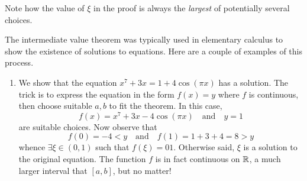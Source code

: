 
Note how the value of $\xi$ in the proof is always the \emph{largest} of potentially several choices.\smallbreak



\begin{examples}{}{}
	The intermediate value theorem was typically used in elementary calculus to show the existence of solutions to equations. Here are a couple of examples of this process.
	\begin{enumerate}
	  \item We show that the equation $x^7+3x=1+4\cos(\pi x)$ has a solution.\smallbreak
		The trick is to express the equation in the form $f(x)=y$ where $f$ is continuous, then choose suitable $a,b$ to fit the theorem. In this case,
		\[f(x)=x^7+3x-4\cos(\pi x)\quad\text{and}\quad y=1\]
		are suitable choices. Now observe that
		\[f(0)=-4<y\quad\text{and}\quad f(1)=1+3+4=8>y \tag{i.e., $a=0$ and $b=1$}\]
		whence $\exists\xi\in(0,1)$ such that $f(\xi)=01$. Otherwise said, $\xi$ is a solution to the original equation.\smallbreak
		The function $f$ is in fact continuous on $\mathbb{R}$, a much larger interval that $[a,b]$, but no matter!
		
		\goodbreak
		

\end{enumerate}
\end{examples}
